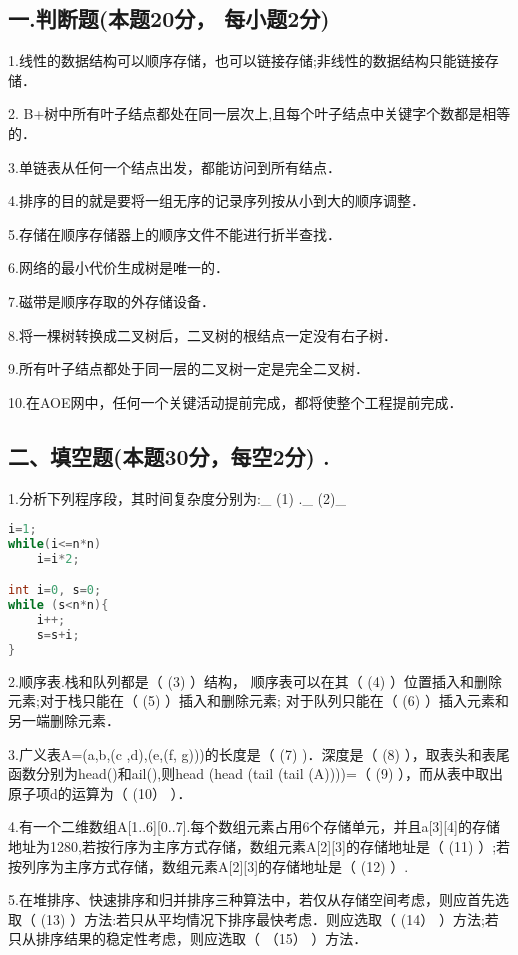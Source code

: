 
\subsection{一.判断题(本题20分， 每小题2分)}

1.线性的数据结构可以顺序存储，也可以链接存储;非线性的数据结构只能链接存储．

2. B+树中所有叶子结点都处在同一层次上,且每个叶子结点中关键字个数都是相等的．

3.单链表从任何一个结点出发，都能访问到所有结点．

4.排序的目的就是要将一组无序的记录序列按从小到大的顺序调整．

5.存储在顺序存储器上的顺序文件不能进行折半查找．

6.网络的最小代价生成树是唯一的．

7.磁带是顺序存取的外存储设备．

8.将一棵树转换成二叉树后，二叉树的根结点一定没有右子树．

9.所有叶子结点都处于同一层的二叉树一定是完全二叉树．

10.在AOE网中，任何一个关键活动提前完成，都将使整个工程提前完成．

\subsection{二、填空题(本题30分，每空2分) .}

1.分析下列程序段，其时间复杂度分别为:_ (1) ._ (2)_
\begin{lstlisting}[language=cpp]
i=1;
while(i<=n*n)
    i=i*2;

int i=0, s=0;
while (s<n*n){
    i++;
    s=s+i;
}
\end{lstlisting}

2.顺序表.栈和队列都是（ (3) ）结构， 顺序表可以在其（ (4) ）位置插入和删除元素;对于栈只能在（ (5) ）插入和删除元素; 对于队列只能在（ (6) ）插入元素和另一端删除元素．

3.广义表A=(a,b,(c ,d),(e,(f, g)))的长度是（ (7) )．深度是（ (8) ），取表头和表尾函数分别为head()和ail(),则head (head (tail (tail (A))))=（ (9) ），而从表中取出原子项d的运算为（ (10） ）．

4.有一个二维数组A[1..6][0..7].每个数组元素占用6个存储单元，并且a[3][4]的存储地址为1280,若按行序为主序方式存储，数组元素A[2][3]的存储地址是（ (11) ）;若按列序为主序方式存储，数组元素A[2][3]的存储地址是（ (12) ）.

5.在堆排序、快速排序和归并排序三种算法中，若仅从存储空间考虑，则应首先选取（ (13) ）方法:若只从平均情况下排序最快考虑．则应选取（ (14） ）方法;若只从排序结果的稳定性考虑，则应选取（ （15） ）方法．


